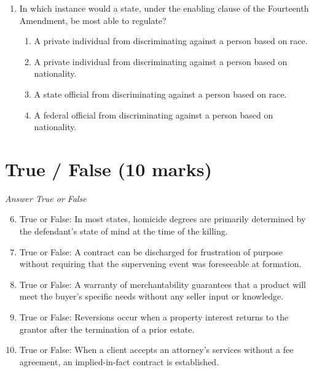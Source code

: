 \documentclass[12pt]{article}
\begin{document}
\begin{enumerate}[label=\arabic*.]
\begin{enumerate}[label=(\alph*)]
    \item It is an agreement between two or more to commit a crime.
    \item It is solicitation of another to commit a felony.
    \item No act is needed other than the solicitation.
    \item Withdrawal is generally not a defense.
\end{enumerate}
\item In which instance would a state, under the enabling clause of the Fourteenth Amendment, be most able to regulate?
\begin{enumerate}[label=(\alph*)]
    \item A private individual from discriminating against a person based on race.
    \item A private individual from discriminating against a person based on nationality.
    \item A state official from discriminating against a person based on race.
    \item A federal official from discriminating against a person based on nationality.
\end{enumerate}
\end{enumerate}

\section*{True / False (10 marks)}
\textit{Answer True or False}
\begin{enumerate}[label=\arabic*.]
\setcounter{enumi}{5}
\item True or False: In most states, homicide degrees are primarily determined by the defendant's state of mind at the time of the killing.
\item True or False: A contract can be discharged for frustration of purpose without requiring that the supervening event was foreseeable at formation.
\item True or False: A warranty of merchantability guarantees that a product will meet the buyer's specific needs without any seller input or knowledge.
\item True or False: Reversions occur when a property interest returns to the grantor after the termination of a prior estate.
\item True or False: When a client accepts an attorney's services without a fee agreement, an implied-in-fact contract is established.
\end{enumerate}
\end{document}
